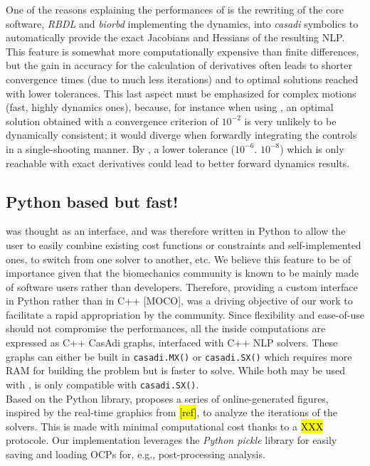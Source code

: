 One of the reasons explaining the performances of \bioptim is the rewriting of the core software, \textit{RBDL} and \textit{biorbd} implementing the dynamics, into \textit{casadi} symbolics to automatically provide the exact Jacobians and Hessians of the resulting NLP.  
This feature is somewhat more computationally expensive than finite differences, but the gain in accuracy for the calculation of derivatives often leads to shorter convergence times (due to much less iterations) and to optimal solutions reached with lower tolerances.
This last aspect must be emphasized for complex motions (fast, highly dynamics ones), because, for instance when using \ipopt, an optimal solution obtained with a convergence criterion of $10^{-2}$ is very unlikely to be dynamically consistent; 
it would diverge when forwardly integrating the controls in a single-shooting manner. 
By , a lower tolerance ($10^{-6}$. $10^{-8}$) which is only reachable with exact derivatives could lead to better forward dynamics results.

\subsection{Python based but fast!}

\bioptim was thought as an interface, and was therefore written in Python to allow the user to easily combine existing cost functions or constraints and self-implemented ones, to switch from one solver to another, etc. 
We believe this feature to be of importance given that the biomechanics community is known to be mainly made of software users rather than developers.
Therefore, providing a custom interface in Python rather than in C++ [MOCO], was a driving objective of our work to facilitate a rapid appropriation by the community.
Since flexibility and ease-of-use should not compromise the performances, all the inside computations are expressed as C++ CasAdi graphs, interfaced with C++ NLP solvers.
These graphs can either be built in \texttt{casadi.MX()} or \texttt{casadi.SX()} which requires more RAM for building the problem but is faster to solve.
While both may be used with \ipopt, \acados is only compatible with \texttt{casadi.SX()}.\\
Based on the \bioviz Python library, \bioptim proposes a series of online-generated figures, inspired by the  real-time graphics from \muscodii \hl{[ref]}, to analyze the iterations of the solvers.
This is made with minimal computational cost thanks to a \hl{XXX} protocole. 
Our implementation leverages the \textit{Python pickle} library for easily saving and loading OCPs for, e.g., post-processing analysis.

